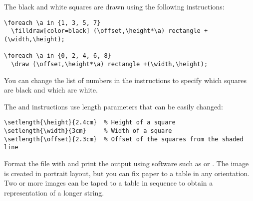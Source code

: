 The black and white squares are drawn using the following instructions: 
\begin{footnotesize}
\begin{verbatim}
\foreach \a in {1, 3, 5, 7}
  \filldraw[color=black] (\offset,\height*\a) rectangle +(\width,\height);

\foreach \a in {0, 2, 4, 6, 8}
  \draw (\offset,\height*\a) rectangle +(\width,\height);
\end{verbatim}
\end{footnotesize}
You can change the list of numbers in the  instructions
to specify which squares are black and which are white.

The  and  instructions use length parameters that
can be easily changed:
\begin{footnotesize}
\begin{verbatim}
\setlength{\height}{2.4cm}  % Height of a square
\setlength{\width}{3cm}     % Width of a square
\setlength{\offset}{2.3cm}  % Offset of the squares from the shaded line
\end{verbatim}
\end{footnotesize}

Format the file with  and print the output using software
such as  or . The image is created in
portrait layout, but you can fix paper to a table in any orientation.
Two or more images can be taped to a table in sequence to obtain a
representation of a longer string.

